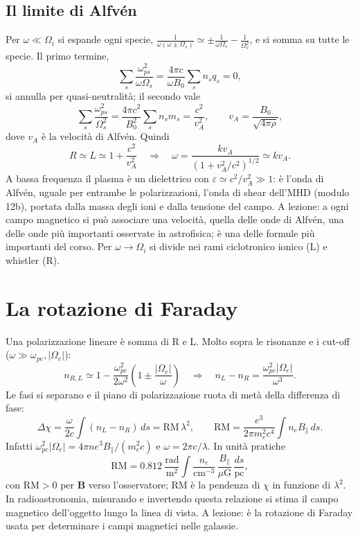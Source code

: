 \subsection{Il limite di Alfv\'en}
Per $\omega\ll\Omega_i$ si espande ogni specie, $\frac{1}{\omega(\omega\pm\Omega_s)}\simeq\pm\frac{1}{\omega\Omega_s}-\frac{1}{\Omega_s^2}$, e si somma su tutte le specie. Il primo termine,
\begin{equation}
\sum_s\frac{\omega_{ps}^2}{\omega\Omega_s}=\frac{4\pi c}{\omega B_0}\sum_sn_sq_s=0,
\end{equation}
si annulla per quasi-neutralità; il secondo vale
\begin{equation}
\sum_s\frac{\omega_{ps}^2}{\Omega_s^2}=\frac{4\pi c^2}{B_0^2}\sum_sn_sm_s=\frac{c^2}{v_A^2},\qquad v_A=\frac{B_0}{\sqrt{4\pi\rho}},
\end{equation}
dove $v_A$ è la velocità di Alfv\'en. Quindi
\begin{equation}
R\simeq L\simeq1+\frac{c^2}{v_A^2}\quad\Rightarrow\quad\omega=\frac{kv_A}{(1+v_A^2/c^2)^{1/2}}\simeq kv_A .
\end{equation}
A bassa frequenza il plasma è un dielettrico con $\varepsilon\simeq c^2/v_A^2\gg1$: è l'onda di Alfv\'en, uguale per entrambe le polarizzazioni, l'onda di shear dell'MHD (modulo 12b), portata dalla massa degli ioni e dalla tensione del campo. A lezione: a ogni campo magnetico si può associare una velocità, quella delle onde di Alfv\'en, una delle onde più importanti osservate in astrofisica; è una delle formule più importanti del corso. Per $\omega\to\Omega_i$ si divide nei rami ciclotronico ionico (L) e whistler (R).

\section{La rotazione di Faraday}
Una polarizzazione lineare è somma di R e L. Molto sopra le risonanze e i cut-off ($\omega\gg\omega_{pe},|\Omega_e|$):
\begin{equation}
n_{R,L}\simeq1-\frac{\omega_{pe}^2}{2\omega^2}\left(1\pm\frac{|\Omega_e|}{\omega}\right)\quad\Rightarrow\quad n_L-n_R=\frac{\omega_{pe}^2|\Omega_e|}{\omega^3}.
\end{equation}
Le fasi si separano e il piano di polarizzazione ruota di metà della differenza di fase:
\begin{equation}
\Delta\chi=\frac{\omega}{2c}\int(n_L-n_R)\,ds=\mathrm{RM}\,\lambda^2,\qquad\mathrm{RM}=\frac{e^3}{2\pi m_e^2c^4}\int n_eB_\parallel\,ds .
\end{equation}
Infatti $\omega_{pe}^2|\Omega_e|=4\pi n e^3B_\parallel/(m_e^2c)$ e $\omega=2\pi c/\lambda$. In unità pratiche
\begin{equation}
\mathrm{RM}=0.812\ \frac{\mathrm{rad}}{\mathrm{m}^2}\int\frac{n_e}{\mathrm{cm}^{-3}}\,\frac{B_\parallel}{\mu\mathrm{G}}\,\frac{ds}{\mathrm{pc}},
\end{equation}
con $\mathrm{RM}>0$ per $\mathbf{B}$ verso l'osservatore; $\mathrm{RM}$ è la pendenza di $\chi$ in funzione di $\lambda^2$. In radioastronomia, misurando e invertendo questa relazione si stima il campo magnetico dell'oggetto lungo la linea di vista. A lezione: è la rotazione di Faraday usata per determinare i campi magnetici nelle galassie.

